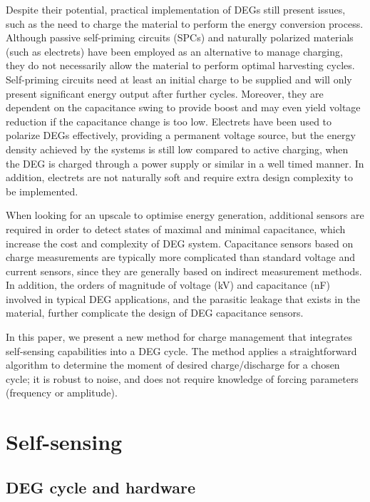 Despite their potential, practical implementation of DEGs still present issues, such as the need to charge the material to perform the energy conversion process. Although passive self-priming circuits (SPCs)\cite{spc1} and naturally polarized materials (such as electrets\cite{RN228}) have been employed as an alternative to manage charging, they do not necessarily allow the material to perform optimal harvesting cycles\cite{RN85}. Self-priming circuits need at least an initial charge to be supplied and will only present significant energy output after further cycles. Moreover, they are dependent on the capacitance swing to provide boost and may even yield voltage reduction if the capacitance change is too low\cite{spcpatrin,RN696}. Electrets have been used to polarize DEGs effectively, providing a permanent voltage source, but the energy density achieved by the systems is still low compared to active charging, when the DEG is charged through a power supply or similar in a well timed manner\cite{RN228,RN85}. In addition, electrets are not naturally soft and require extra design complexity to be implemented.

When looking for an upscale to optimise energy generation, additional sensors are required in order to detect states of maximal and minimal capacitance, which increase the cost and complexity of DEG system. Capacitance sensors based on charge measurements are typically more complicated than standard voltage and current sensors, since they are generally based on indirect measurement methods. In addition, the orders of magnitude of voltage (kV) and capacitance (nF) involved in typical DEG applications, and the parasitic leakage that exists in the material, further complicate the design of DEG capacitance sensors.

In this paper, we present a new method for charge management that integrates self-sensing capabilities into a DEG cycle. The method applies a straightforward algorithm to determine the moment of desired charge/discharge for a chosen cycle; it is robust to noise, and does not require knowledge of forcing parameters (frequency or amplitude).

\section{Self-sensing}
\subsection{DEG cycle and hardware}

